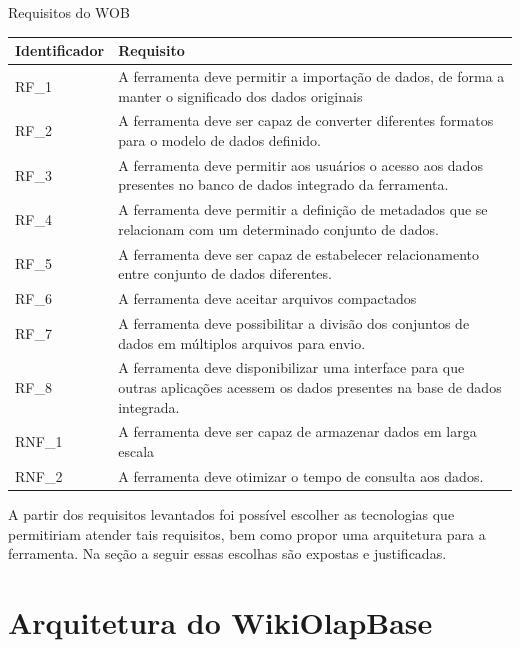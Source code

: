 \begin{quadro}[!htb]
    \centering
    \caption{Requisitos do WOB}
    \label{quadro:requisitos}
    \begin{tabular}{|p{2cm}|p{13cm}|}
        \hline
        Identificador   &   Requisito \\
        \hline
        RF\_1    &  A ferramenta deve permitir a importação de dados, de forma a manter o significado dos dados originais \\   
        \hline
        RF\_2    &  A ferramenta deve ser capaz de converter diferentes formatos para o modelo de dados definido. \\        
        \hline
        RF\_3    &  A ferramenta deve permitir aos usuários o acesso aos dados presentes no banco de dados integrado da ferramenta. \\
        \hline
        RF\_4    &  A ferramenta deve permitir a definição de metadados que se relacionam com um determinado conjunto de dados. \\
        \hline
        RF\_5    &  A ferramenta deve ser capaz de estabelecer relacionamento entre conjunto de dados diferentes. \\
        \hline
        RF\_6    &  A ferramenta deve aceitar arquivos compactados \\
        \hline
        RF\_7    &  A ferramenta deve possibilitar a divisão dos conjuntos de dados em múltiplos arquivos para envio. \\        
        \hline
        RF\_8    &  A ferramenta deve disponibilizar uma interface para que outras aplicações acessem os dados presentes na base de dados integrada. \\
        \hline
        RNF\_1    &  A ferramenta deve ser capaz de armazenar dados em larga escala \\
        \hline
        RNF\_2    &  A ferramenta deve otimizar o tempo de consulta aos dados. \\ 
        \hline   
    \end{tabular}
\end{quadro}

A partir dos requisitos levantados foi possível escolher as tecnologias que permitiriam atender
tais requisitos, bem como propor uma arquitetura para a ferramenta. Na seção a seguir essas 
escolhas são expostas e justificadas.

\section{Arquitetura do WikiOlapBase}
\label{sec:arquitetura}

